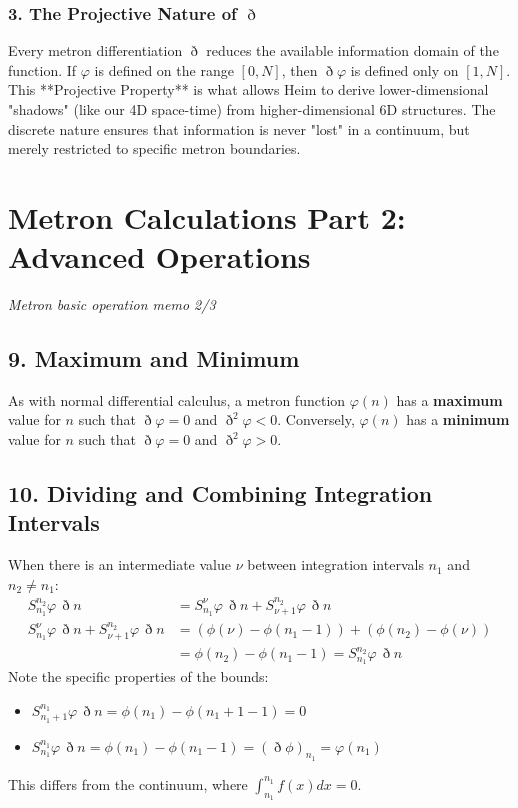 \documentclass[11pt,a4paper,oneside]{article}
\begin{document}
\subsubsection*{3. The Projective Nature of $\eth$}
Every metron differentiation $\eth$ reduces the available information domain of the function. If $\varphi$ is defined on the range $[0, N]$, then $\eth \varphi$ is defined only on $[1, N]$. This **Projective Property** is what allows Heim to derive lower-dimensional "shadows" (like our 4D space-time) from higher-dimensional 6D structures. The discrete nature ensures that information is never "lost" in a continuum, but merely restricted to specific metron boundaries. 
\section{Metron Calculations Part 2: Advanced Operations}
\textit{Metron basic operation memo 2/3}

\subsection{9. Maximum and Minimum}

As with normal differential calculus, a metron function $\varphi(n)$ has a \textbf{maximum} value for $n$ such that $\eth \varphi = 0$ and $\eth^2 \varphi < 0$. Conversely, $\varphi(n)$ has a \textbf{minimum} value for $n$ such that $\eth \varphi = 0$ and $\eth^2 \varphi > 0$.

\subsection{10. Dividing and Combining Integration Intervals}

When there is an intermediate value $\nu$ between integration intervals $n_1$ and $n_2 \neq n_1$:
\begin{align*}
    S_{n_1}^{n_2} \varphi \, \eth n &= S_{n_1}^{\nu} \varphi \, \eth n + S_{\nu + 1}^{n_2} \varphi \, \eth n \\
    S_{n_1}^{\nu} \varphi \, \eth n + S_{\nu + 1}^{n_2} \varphi \, \eth n &= (\phi(\nu) - \phi(n_1 - 1)) + (\phi(n_2) - \phi(\nu)) \\
    &= \phi(n_2) - \phi(n_1 - 1) = S_{n_1}^{n_2} \varphi \, \eth n
\end{align*}
Note the specific properties of the bounds:
\begin{itemize}
    \item $S_{n_1 + 1}^{n_1} \varphi \, \eth n = \phi(n_1) - \phi(n_1 + 1 - 1) = 0$
    \item $S_{n_1}^{n_1} \varphi \, \eth n = \phi(n_1) - \phi(n_1 - 1) = (\eth \phi)_{n_1} = \varphi(n_1)$
\end{itemize}
This differs from the continuum, where $\int_{n_1}^{n_1} f(x)dx = 0$.
\end{document}
